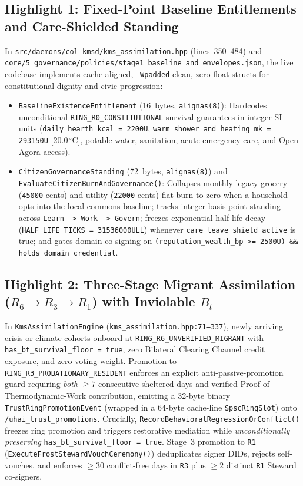 \subsection{Highlight 1: Fixed-Point Baseline Entitlements and Care-Shielded Standing}

In \texttt{src/daemons/\allowbreak col-kmsd/\allowbreak kms\_assimilation.hpp} (lines~350--484) and
\texttt{core/5\_governance/\allowbreak policies/\allowbreak stage1\_baseline\_and\_envelopes.json}, the live codebase
implements cache-aligned, \texttt{-Wpadded}-clean, zero-float structs for constitutional
dignity and civic progression:
\begin{itemize}
\item \texttt{BaselineExistenceEntitlement} (16~bytes, \texttt{alignas(8)}): Hardcodes
        unconditional \texttt{RING\_R0\_CONSTITUTIONAL} survival guarantees in integer SI units
        (\texttt{daily\_hearth\_kcal = 2200U}, \texttt{warm\_shower\_and\_heating\_mk = 293150U}
        [$20.0\,^\circ\mathrm{C}$], potable water, sanitation, acute emergency care, and Open
        Agora access).
\item \texttt{CitizenGovernanceStanding} (72~bytes, \texttt{alignas(8)}) and
        \texttt{EvaluateCitizenBurnAndGovernance()}: Collapses monthly legacy grocery
        (\texttt{45000} cents) and utility (\texttt{22000} cents) fiat burn to zero when a
        household opts into the local commons baseline; tracks integer basis-point standing
        across \texttt{Learn -> Work -> Govern}; freezes exponential half-life decay
        (\texttt{HALF\_LIFE\_TICKS = 31536000ULL}) whenever \texttt{care\_leave\_shield\_active}
        is true; and gates domain co-signing on \texttt{(reputation\_wealth\_bp >= 2500U) \&\&
        holds\_domain\_credential}.
\end{itemize}

\subsection{Highlight 2: Three-Stage Migrant Assimilation ($R_6 \to R_3 \to R_1$) with Inviolable $B_t$}

In \texttt{KmsAssimilationEngine} (\texttt{kms\_assimilation.hpp:71--337}), newly arriving
crisis or climate cohorts onboard at \texttt{RING\_R6\_UNVERIFIED\_MIGRANT} with
\texttt{has\_bt\_survival\_floor = true}, zero Bilateral Clearing Channel credit exposure, and
zero voting weight. Promotion to \texttt{RING\_R3\_PROBATIONARY\_RESIDENT} enforces an explicit
anti-passive-promotion guard requiring \textit{both} $\ge 7$ consecutive sheltered days and
verified Proof-of-Thermodynamic-Work contribution, emitting a 32-byte binary
\texttt{TrustRingPromotionEvent} (wrapped in a 64-byte cache-line \texttt{SpscRingSlot}) onto
\texttt{/uhai\_trust\_promotions}. Crucially, \texttt{RecordBehavioralRegressionOrConflict()}
freezes ring promotion and triggers restorative mediation while \textit{unconditionally
preserving} \texttt{has\_bt\_survival\_floor = true}. Stage~3 promotion to \texttt{R1}
(\texttt{ExecuteFrostStewardVouchCeremony()}) deduplicates signer DIDs, rejects self-vouches,
and enforces $\ge 30$ conflict-free days in \texttt{R3} plus $\ge 2$ distinct \texttt{R1}
Steward co-signers.

